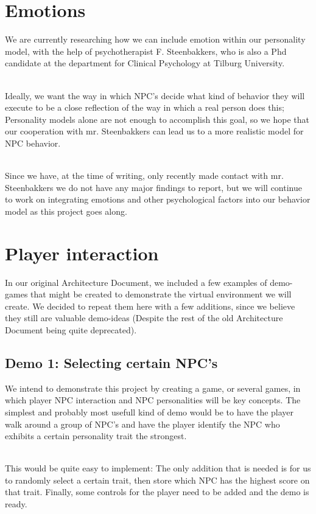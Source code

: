 \documentclass[11pt]{article} %
\begin{document}
\newpage
\section{Emotions}
We are currently researching how we can include emotion within our personality model, with the help of psychotherapist F. Steenbakkers, who is also a Phd candidate at the department for Clinical Psychology at Tilburg University. 

~\\
Ideally, we want the way in which NPC's decide what kind of behavior they will execute to be a close reflection of the way in which a real person does this; Personality models alone are not enough to accomplish this goal, so we hope that our cooperation with mr. Steenbakkers can lead us to a more realistic model for NPC behavior. 

~\\
Since we have, at the time of writing, only recently made contact with mr. Steenbakkers we do not have any major findings to report, but we will continue to work on integrating emotions and other psychological factors into our behavior model as this project goes along.

\newpage
\section{Player interaction}
In our original Architecture Document, we included a few examples of demo-games that might be created to demonstrate the virtual environment we will create. We decided to repeat them here with a few additions, since we believe they still are valuable demo-ideas (Despite the rest of the old Architecture Document being quite deprecated).


\subsection{Demo 1: Selecting certain NPC's}
We intend to demonstrate this project by creating a game, or several games, in which player NPC interaction and NPC personalities will be key concepts. The simplest and probably most usefull kind of demo would be to have the player walk around a group of NPC's and have the player identify the NPC who exhibits a certain personality trait the strongest. 

~\\
This would be quite easy to implement: The only addition that is needed is for us to randomly select a certain trait, then store which NPC has the highest score on that trait. Finally, some controls for the player need to be added and the demo is ready. 
\end{document}
